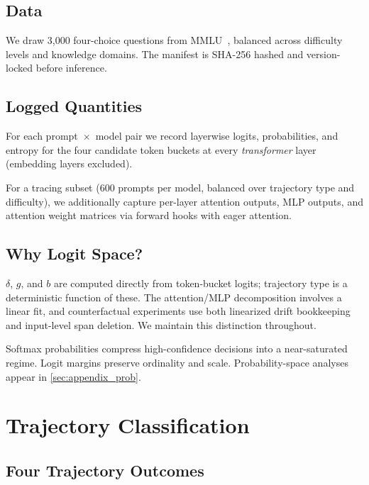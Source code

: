 \documentclass{article}
\begin{document}
\subsection{Data}

We draw 3{,}000 four-choice questions from MMLU~\cite{hendrycks2021}, balanced across difficulty levels and knowledge domains.  The manifest is SHA-256 hashed and version-locked before inference.

\subsection{Logged Quantities}

For each prompt~$\times$~model pair we record layerwise logits, probabilities, and entropy for the four candidate token buckets at every \emph{transformer} layer (embedding layers excluded).

For a tracing subset (600 prompts per model, balanced over trajectory type and difficulty), we additionally capture per-layer attention outputs, MLP outputs, and attention weight matrices via forward hooks with eager attention.

\subsection{Why Logit Space?}

$\delta$, $g$, and $b$ are computed directly from token-bucket logits; trajectory type is a deterministic function of these.  The attention/MLP decomposition involves a linear fit, and counterfactual experiments use both linearized drift bookkeeping and input-level span deletion.  We maintain this distinction throughout.

Softmax probabilities compress high-confidence decisions into a near-saturated regime.  Logit margins preserve ordinality and scale.  Probability-space analyses appear in \cref{sec:appendix_prob}.


\section{Trajectory Classification}
\label{sec:phase}

\subsection{Four Trajectory Outcomes}
\end{document}
